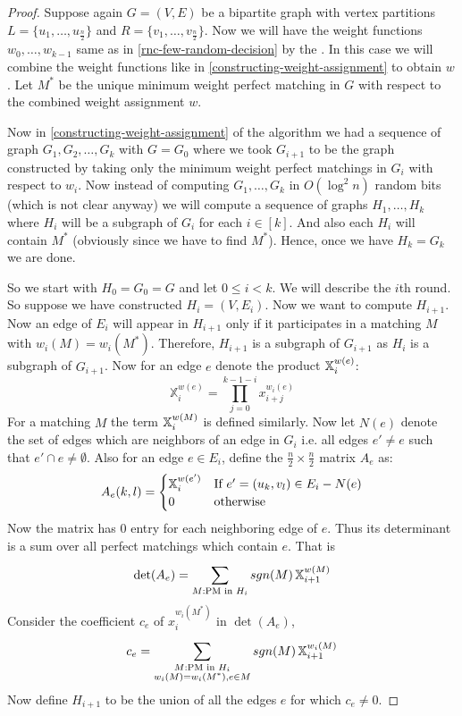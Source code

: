 \begin{proof}
	Suppose again $G=(V,E)$ be a bipartite graph with vertex partitions $L=\{u_1,\dots, u_{\frac{n}{2}}\}$ and $R=\{v_1,\dots,v_{\frac{n }{2}}\}$. Now we will have the weight functions $w_0,\dots, w_{k-1}$ same as in \autoref{rnc-few-random-decision} by the . In this case we will combine the weight functions like in \autoref{constructing-weight-assignment} to obtain $w$. Let $M^*$ be the unique minimum weight perfect matching in $G$ with respect to the combined weight assignment $w$.

Now in \autoref{constructing-weight-assignment} of the  algorithm we had a sequence of graph $G_1,G_2,\dots, G_{k}$ with $G=G_0$ where we took $G_{i+1}$ to be the graph constructed by taking only the minimum weight perfect matchings in $G_{i}$ with respect to $w_{i}$. Now instead of computing $G_1,\dots, G_k$ in $O(\log^2n)$ random bits (which is not clear anyway) we will compute a sequence of graphs $H_1,\dots, H_k$ where $H_{i}$ will be a subgraph of $G_{i}$ for each $i\in[k]$. And also each $H_i$ will contain $M^*$ (obviously since we have to find $M^*$). Hence, once we have $H_k=G_k$ we are done.

So we start with $H_0=G_0=G$ and let $0\leq i<k$. We will describe the $i$th round. So suppose we have constructed $H_i=(V,E_i)$. Now we want to compute $H_{i+1}$. Now an edge of $E_i$ will appear in $H_{i+1}$ only if it participates in a matching $M$ with $w_i(M)=w_i(M^*)$. Therefore, $H_{i+1}$ is a subgraph of $G_{i+1}$ as $H_i$ is a subgraph of $G_{i+1}$. Now for an edge $e$ denote the product $\mathbb{X}_i^{w(e)}$:\[
	\mathbb{X}_i^{w(e)}= \prod_{j=0}^{k-1-i}x_{i+j}^{w_i(e)}
\]For a matching $M$ the term $\mathbb{X}^{w(M)}_i$ is defined similarly. Now let $N(e)$ denote the set of edges which are neighbors of an edge in $G_i$ i.e. all edges $e'\neq e$ such that $e'\cap e\neq \emptyset$. Also for an edge $e\in E_i$, define the $\frac{n}{2}\times \frac{n}{2}$ matrix $A_e$ as:\[
	A_e(k,l)=\begin{cases}
		\mathbb{X}^{w(e')}_i & \text{If $e'=(u_k,v_l)\in E_i-N(e)$} \\
		0              & \text{otherwise}
	\end{cases}
\]
Now the matrix has $0$ entry for each neighboring edge of $e$. Thus its determinant is a sum over all perfect matchings which contain $e$. That is\[
	\det(A_e)= \sum\limits_{M:\text{PM in $H_i$}}^{} sgn(M)\,\mathbb{X}_{i+1}^{w(M)}
\]Consider the coefficient $c_e$ of $x_i^{w_i(M^*)}$ in $\det(A_e)$, \[
	 c_e=\sum\limits_{\substack{M:\text{PM in $H_i$} \\ w_i(M)=w_i(M^*),e\in M}}^{}sgn(M)\,\mathbb{X}_{i+1}^{w_i(M)}
\]Now define $H_{i+1}$ to be the union of all the edges $e$ for which $c_e\neq 0$.\parinf


\end{proof}
